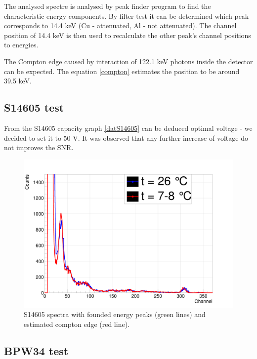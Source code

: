 The analysed spectre is analysed by peak finder program to find the characteristic energy components. By filter test it can be determined which peak corresponds to 14.4 keV (Cu - attenuated, Al - not attenuated). The channel position of 14.4 keV is then used to recalculate the other peak's channel positions to energies.
\par
The Compton edge caused by interaction of 122.1 keV photons inside the detector can be expected. The equation \ref{compton} estimates the position to be around 39.5 keV. 

\subsection{S14605 test}
From the S14605 capacity graph \ref{datS14605} can be deduced optimal voltage - we decided to set it to 50 V. It was observed that any further increase of voltage do not improves the SNR.


\begin{figure}[H]
 \centering
 \includegraphics[scale=0.13, angle = 0]{./pictures/TempDiff.png}
 \caption{S14605 spectra with founded energy peaks (green lines) and estimated compton edge (red line).}
 \label{S14605 spectra}
 
\end{figure}


\subsection{BPW34 test}


